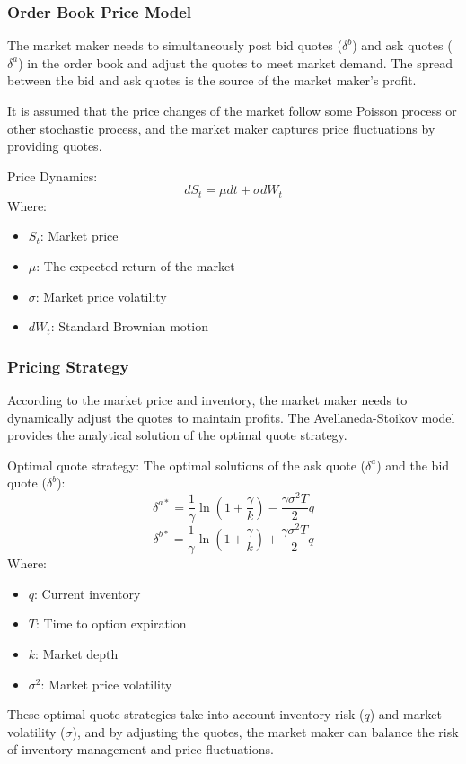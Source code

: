 \documentclass[12pt, oneside]{article}
\numberwithin{equation}{section}
\begin{document}
\subsubsection{Order Book Price Model}

The market maker needs to simultaneously post bid quotes (\(\delta^b\)) and ask quotes (\(\delta^a\)) in the order book and adjust the quotes to meet market demand. The spread between the bid and ask quotes is the source of the market maker's profit.

It is assumed that the price changes of the market follow some Poisson process or other stochastic process, and the market maker captures price fluctuations by providing quotes.

Price Dynamics:
\[
dS_t = \mu dt + \sigma dW_t
\]
Where:
\begin{itemize}
    \item \(S_t\): Market price
    \item \(\mu\): The expected return of the market
    \item \(\sigma\): Market price volatility
    \item \(dW_t\): Standard Brownian motion
\end{itemize}

\subsubsection{Pricing Strategy}

According to the market price and inventory, the market maker needs to dynamically adjust the quotes to maintain profits. The Avellaneda-Stoikov model provides the analytical solution of the optimal quote strategy.

Optimal quote strategy:
The optimal solutions of the ask quote (\(\delta^a\)) and the bid quote (\(\delta^b\)):
\[
\delta^{a*} = \frac{1}{\gamma} \ln\left(1 + \frac{\gamma}{k}\right) - \frac{\gamma \sigma^2 T}{2} q
\]
\[
\delta^{b*} = \frac{1}{\gamma} \ln\left(1 + \frac{\gamma}{k}\right) + \frac{\gamma \sigma^2 T}{2} q
\]
Where:
\begin{itemize}
    \item \(q\): Current inventory
    \item \(T\): Time to option expiration
    \item \(k\): Market depth
    \item \(\sigma^2\): Market price volatility
\end{itemize}

These optimal quote strategies take into account inventory risk (\(q\)) and market volatility (\(\sigma\)), and by adjusting the quotes, the market maker can balance the risk of inventory management and price fluctuations.
\end{document}

